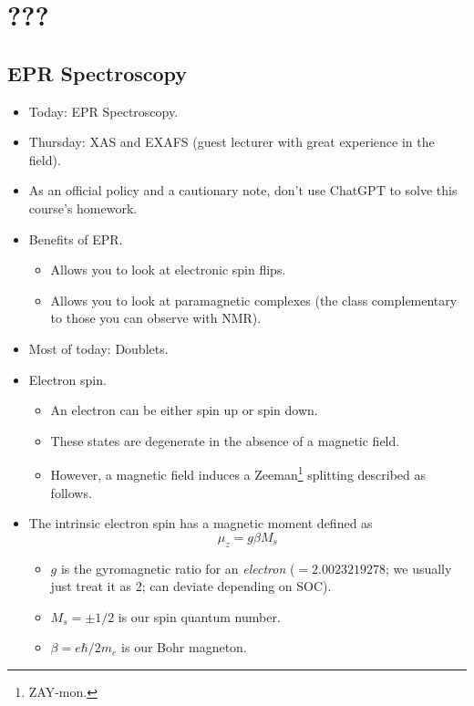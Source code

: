 \documentclass[../notes.tex]{subfiles}
\begin{document}
\chapter{???}
\section{EPR Spectroscopy}
\begin{itemize}
    \item {}Today: EPR Spectroscopy.
    \item Thursday: XAS and EXAFS (guest lecturer with great experience in the field).
    \item As an official policy and a cautionary note, don't use ChatGPT to solve this course's homework.
    \item Benefits of EPR.
    \begin{itemize}
        \item Allows you to look at electronic spin flips.
        \item Allows you to look at paramagnetic complexes (the class complementary to those you can observe with NMR).
    \end{itemize}
    \item Most of today: Doublets.
    \item Electron spin.
    \begin{itemize}
        \item An electron can be either spin up or spin down.
        \item These states are degenerate in the absence of a magnetic field.
        \item However, a magnetic field induces a Zeeman\footnote{ZAY-mon.} splitting described as follows.
    \end{itemize}
    \item The intrinsic electron spin has a magnetic moment defined as
    \begin{equation*}
        \mu_z = g\beta M_s
    \end{equation*}
    \begin{itemize}
        \item $g$ is the gyromagnetic ratio for an \emph{electron} ($=2.0023219278$; we usually just treat it as 2; can deviate depending on SOC).
        \item $M_s=\pm 1/2$ is our spin quantum number.
        \item $\beta=e\hbar/2m_e$ is our Bohr magneton.
    \end{itemize}

\end{itemize}
\end{document}
